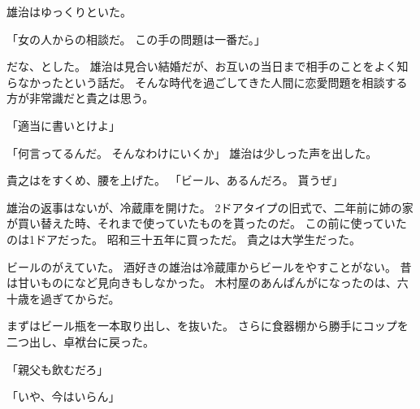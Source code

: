 \documentclass[chapter3.tex]{subfiles}
\begin{document}
\begin{CJK}{UTF8}{ipxm}
    雄治はゆっくりといた。
    
    「女の人からの相談だ。
    この手の問題は一番だ。」
    
    だな、とした。
    雄治は見合い結婚だが、お互いの当日まで相手のことをよく知らなかったという話だ。
    そんな時代を過ごしてきた人間に恋愛問題を相談する方が非常識だと貴之は思う。

    「適当に書いとけよ」

    「何言ってるんだ。
    そんなわけにいくか」
    雄治は少しった声を出した。

    貴之はをすくめ、腰を上げた。
    「ビール、あるんだろ。
    貰うぜ」

    雄治の返事はないが、冷蔵庫を開けた。
    2ドアタイプの旧式で、二年前に姉の家が買い替えた時、それまで使っていたものを貰ったのだ。
    この前に使っていたのは1ドアだった。
    昭和三十五年に買っただ。
    貴之は大学生だった。
    
    ビールのがえていた。
    酒好きの雄治は冷蔵庫からビールをやすことがない。
    昔は甘いものになど見向きもしなかった。
    木村屋のあんぱんがになったのは、六十歳を過ぎてからだ。

    まずはビール瓶を一本取り出し、を抜いた。
    さらに食器棚から勝手にコップを二つ出し、卓袱台に戻った。

    「親父も飲むだろ」

    「いや、今はいらん」
\end{CJK}
\end{document}
